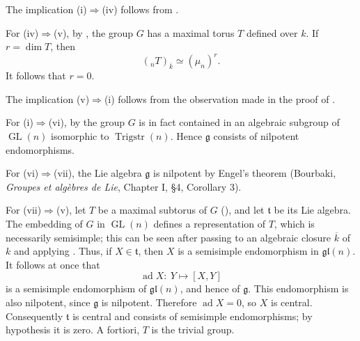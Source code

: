 
The implication (i)\(\Rightarrow\)(iv) follows from .

For (iv)\(\Rightarrow\)(v), by , the group \(G\)
has a maximal torus \(T\) defined over \(k\).  If \(r=\dim T\),
then
\[
  ({}_nT)_{\overline{k}}\simeq(\mu_n)^r.
\]
It follows that \(r=0\).

The implication (v)\(\Rightarrow\)(i) follows from the observation
made in the proof of .

For (i)\(\Rightarrow\)(vi), by  the group \(G\) is in fact
contained in an algebraic subgroup of \(\operatorname{GL}(n)\)
isomorphic to \(\operatorname{Trigstr}(n)\).  Hence
\(\mathfrak g\) consists of nilpotent endomorphisms.

For (vi)\(\Rightarrow\)(vii), the Lie algebra \(\mathfrak g\) is
nilpotent by Engel's theorem (Bourbaki, \emph{Groupes et algèbres
de Lie}, Chapter I, \S4, Corollary 3).

For (vii)\(\Rightarrow\)(v), let \(T\) be a maximal subtorus of
\(G\) (), and let \(\mathfrak t\) be its Lie
algebra.  The embedding of \(G\) in \(\operatorname{GL}(n)\)
defines a representation of \(T\), which is necessarily
semisimple; this can be seen after passing to an algebraic closure
\(\overline{k}\) of \(k\) and applying .  Thus, if
\(X\in\mathfrak t\), then \(X\) is a semisimple endomorphism in
\(\mathfrak{gl}(n)\).  It follows at once that
\[
  \operatorname{ad}X:\ Y\longmapsto[X,Y]
\]
is a semisimple endomorphism of \(\mathfrak{gl}(n)\), and hence of
\(\mathfrak g\).  This endomorphism is also nilpotent, since
\(\mathfrak g\) is nilpotent.  Therefore
\(\operatorname{ad}X=0\), so \(X\) is central.  Consequently
\(\mathfrak t\) is central and consists of semisimple
endomorphisms; by hypothesis it is zero.  A fortiori, \(T\) is the
trivial group.



